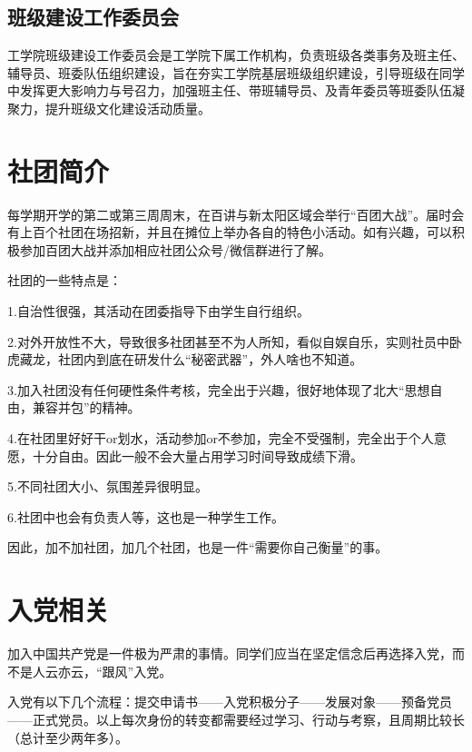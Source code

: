 \documentclass[11pt,oneside]{book}
\begin{document}
\vspace{10pt}


\subsection{班级建设工作委员会}

工学院班级建设工作委员会是工学院下属工作机构，负责班级各类事务及班主任、辅导员、班委队伍组织建设，旨在夯实工学院基层班级组织建设，引导班级在同学中发挥更大影响力与号召力，加强班主任、带班辅导员、及青年委员等班委队伍凝聚力，提升班级文化建设活动质量。

\section{社团简介}
每学期开学的第二或第三周周末，在百讲与新太阳区域会举行“百团大战”。届时会有上百个社团在场招新，并且在摊位上举办各自的特色小活动。如有兴趣，可以积极参加百团大战并添加相应社团公众号/微信群进行了解。

\vspace{10pt}

社团的一些特点是：

1.自治性很强，其活动在团委指导下由学生自行组织。

2.对外开放性不大，导致很多社团甚至不为人所知，看似自娱自乐，实则社员中卧虎藏龙，社团内到底在研发什么“秘密武器”，外人啥也不知道。

3.加入社团没有任何硬性条件考核，完全出于兴趣，很好地体现了北大“思想自由，兼容并包”的精神。

4.在社团里好好干or划水，活动参加or不参加，完全不受强制，完全出于个人意愿，十分自由。因此一般不会大量占用学习时间导致成绩下滑。

5.不同社团大小、氛围差异很明显。

6.社团中也会有负责人等，这也是一种学生工作。 

\vspace{10pt}

因此，加不加社团，加几个社团，也是一件“需要你自己衡量”的事。

\section{入党相关}
加入中国共产党是一件极为严肃的事情。同学们应当在坚定信念后再选择入党，而不是人云亦云，“跟风”入党。

\vspace{10pt}

入党有以下几个流程：提交申请书——入党积极分子——发展对象——预备党员——正式党员。以上每次身份的转变都需要经过学习、行动与考察，且周期比较长（总计至少两年多）。
\end{document}
